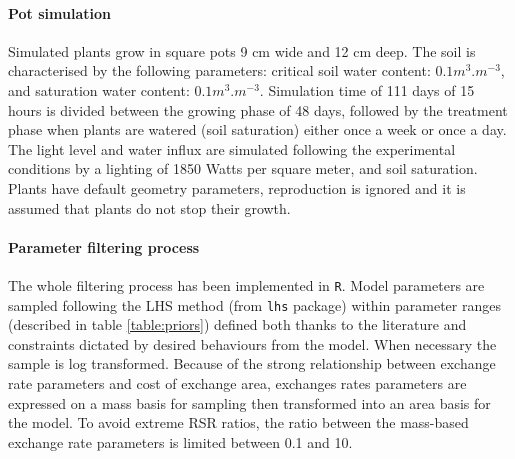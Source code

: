 \paragraph{Pot simulation}
Simulated plants grow in square pots 9 cm wide and 12 cm deep. The soil is characterised by the following parameters: critical soil water content: $0.1 m^3.m^{-3}$, and saturation water content: $0.1 m^3.m^{-3}$. Simulation time of 111 days of 15 hours is divided between the growing phase of 48 days, followed by the treatment phase when plants are watered (soil saturation) either once a week or once a day. The light level and water influx are simulated following the experimental conditions \parencite{peterson_growth_1982} by a lighting of 1850 Watts per square meter, and soil saturation. Plants have default geometry parameters,  reproduction is ignored and it is assumed that plants do not stop their growth.

\paragraph{Parameter filtering process}
The whole filtering process has been implemented in \texttt{R}. Model parameters are sampled following the LHS method (from \texttt{lhs} package) within parameter ranges (described in table \ref{table:priors}) defined both thanks to the literature and constraints dictated by desired behaviours from the model. When necessary the sample is log transformed. Because of the strong relationship between exchange rate parameters and cost of exchange area, exchanges rates parameters are expressed on a mass basis for sampling then transformed into an area basis for the model. To avoid extreme RSR ratios, the ratio between the mass-based exchange rate parameters is limited between 0.1 and 10.

